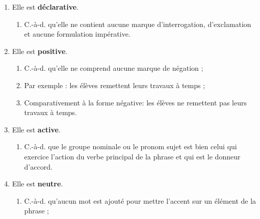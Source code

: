 \documentclass[10pt, french]{article}
\begin{document}
\begin{multicols*}{2}
\begin{center}
\end{center}
\begin{definitionNOHFILLprop}
\begin{enumerate}
	\item	Elle est \textbf{déclarative}.
		\begin{enumerate}
		\item	C.-à-d. qu'elle ne contient aucune marque d'interrogation, d'exclamation et aucune formulation impérative.
		\end{enumerate}
	\item	Elle est \textbf{positive}.
		\begin{enumerate}
		\item	C.-à-d. qu'elle ne comprend aucune marque de négation ;
		\item	Par exemple : les élèves remettent leurs travaux à temps ;
		\item	Comparativement à la forme {\color{teal}négative}: les élèves {\color{teal}ne} remettent {\color{teal}pas} leurs travaux à temps.
		\end{enumerate}
	\item	Elle est \textbf{active}.
		\begin{enumerate}
		\item	C.-à-d. que le groupe nominale ou le pronom sujet est bien celui qui exercice l'action du verbe principal de la phrase et qui est le donneur d'accord.
		\end{enumerate}
	\item	Elle est \textbf{neutre}.
		\begin{enumerate}
		\item	C.-à-d. qu'aucun mot est ajouté pour mettre l'accent sur un élément de la phrase ;

\end{enumerate}
\end{enumerate}
\end{definitionNOHFILLprop}
\end{multicols*}
\end{document}
